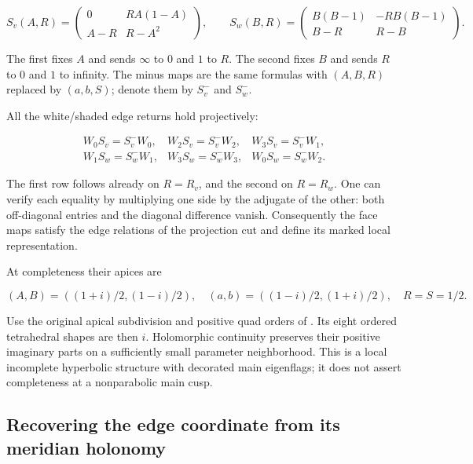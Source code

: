 \begin{equation}\label{ng:N8}
S_v(A,R)=
 \begin{pmatrix}0&RA(1-A)\\A-R&R-A^2\end{pmatrix},\qquad
 S_w(B,R)=
 \begin{pmatrix}B(B-1)&-RB(B-1)\\B-R&R-B\end{pmatrix}.
\end{equation}

The first fixes \(A\) and sends \(\infty\) to \(0\) and \(1\)
to \(R\). The second fixes \(B\) and sends \(R\) to \(0\)
and \(1\) to infinity. The minus maps are the same formulas with
\((A,B,R)\) replaced by \((a,b,S)\); denote them by
\(S_v^-\) and \(S_w^-\).

All the white/shaded edge returns hold projectively:

\begin{equation}\label{ng:N9}
\begin{array}{lll}
 W_0S_v=S_v^-W_0,&W_2S_v=S_v^-W_2,&W_3S_v=S_v^-W_1,\\
 W_1S_w=S_w^-W_1,&W_3S_w=S_w^-W_3,&W_0S_w=S_w^-W_2.
\end{array}
\end{equation}

The first row follows already on \(R=R_v\), and the second on
\(R=R_w\). One can verify each equality by multiplying one side
by the adjugate of the other: both off-diagonal entries and the
diagonal difference vanish. Consequently the face maps satisfy the edge relations of the
projection cut and define its marked local representation.

At completeness their apices are

\begin{equation}\label{ng:N10}
(A,B)=((1+i)/2,(1-i)/2),\quad
 (a,b)=((1-i)/2,(1+i)/2),\quad R=S=1/2.
\end{equation}

Use the original apical subdivision and positive quad orders of
\cite[Lemma~3.1]{Circle}. Its eight ordered tetrahedral shapes
are then \(i\). Holomorphic continuity preserves their
positive imaginary parts on a sufficiently small parameter
neighborhood. This is a local incomplete hyperbolic structure with
decorated main eigenflags; it does not assert completeness at a
nonparabolic main cusp.

\subsection{Recovering the edge coordinate from its meridian holonomy}\label{ng:the-wire-coordinate-is-determined-by-the-actual-meridian}


